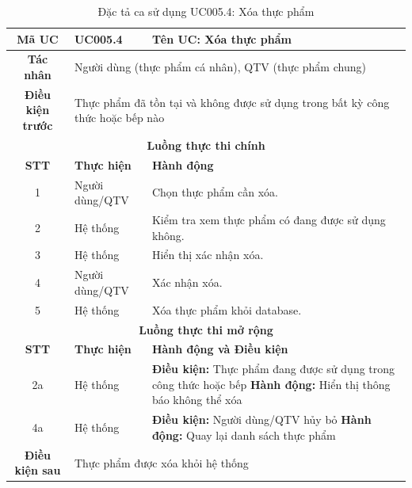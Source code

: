 \begin{table}[H]
    \centering
    \label{tab:uc005-4}
    \begin{tabularx}{\textwidth}{|c|p{3.5cm}|X|}
        \hline
        \rowcolor{headergreen} 
        \textbf{Mã UC} & \textbf{UC005.4} & \textbf{Tên UC: Xóa thực phẩm} \\ \hline
        \textbf{Tác nhân} & \multicolumn{2}{X|}{Người dùng (thực phẩm cá nhân), QTV (thực phẩm chung)} \\ \hline
        \textbf{Điều kiện trước} & \multicolumn{2}{X|}{Thực phẩm đã tồn tại và không được sử dụng trong bất kỳ công thức hoặc bếp nào} \\ \hline
        
        \multicolumn{3}{|c|}{\cellcolor{headerorange}\textbf{Luồng thực thi chính}} \\ \hline
        \rowcolor{graybg} \textbf{STT} & \textbf{Thực hiện} & \textbf{Hành động} \\ \hline
        1 & Người dùng/QTV & Chọn thực phẩm cần xóa. \\ \hline
        2 & Hệ thống & Kiểm tra xem thực phẩm có đang được sử dụng không. \\ \hline
        3 & Hệ thống & Hiển thị xác nhận xóa. \\ \hline
        4 & Người dùng/QTV & Xác nhận xóa. \\ \hline
        5 & Hệ thống & Xóa thực phẩm khỏi database. \\ \hline
        
        \multicolumn{3}{|c|}{\cellcolor{headerorange}\textbf{Luồng thực thi mở rộng}} \\ \hline
        \rowcolor{graybg} \textbf{STT} & \textbf{Thực hiện} & \textbf{Hành động và Điều kiện} \\ \hline
        2a & Hệ thống & \textbf{Điều kiện:} Thực phẩm đang được sử dụng trong công thức hoặc bếp \newline \textbf{Hành động:} Hiển thị thông báo không thể xóa \\ \hline
        4a & Hệ thống & \textbf{Điều kiện:} Người dùng/QTV hủy bỏ \newline \textbf{Hành động:} Quay lại danh sách thực phẩm \\ \hline
        
        \textbf{Điều kiện sau} & \multicolumn{2}{X|}{Thực phẩm được xóa khỏi hệ thống} \\ \hline
    \end{tabularx}
    \caption{Đặc tả ca sử dụng UC005.4: Xóa thực phẩm}
\end{table}

